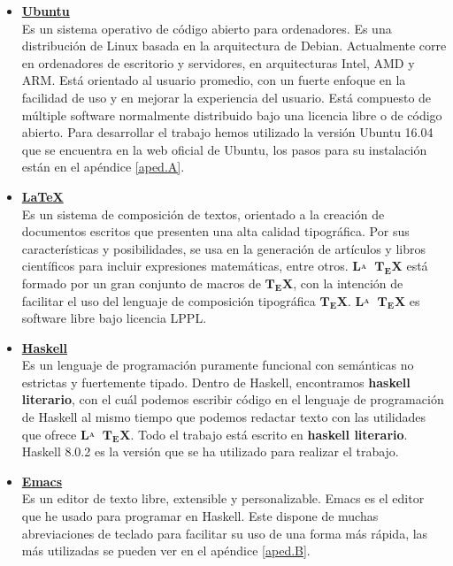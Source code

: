 \begin{itemize}

\item \href{https://www.ubuntu.com/}{\textbf{Ubuntu}}\\
Es un sistema operativo de código abierto para ordenadores. Es una distribución de Linux basada en la arquitectura de Debian. Actualmente corre en ordenadores de escritorio y servidores, en arquitecturas Intel, AMD y ARM. Está orientado al usuario promedio, con un fuerte enfoque en la facilidad de uso y en mejorar la experiencia del usuario. Está compuesto de múltiple software normalmente distribuido bajo una licencia libre o de código abierto. Para desarrollar el trabajo hemos utilizado la versión Ubuntu 16.04 que se encuentra en la web oficial de Ubuntu, los pasos para su instalación están en el apéndice \ref{aped.A}. 

\item \href{https://www.latex-project.org/}{\textbf{LaTeX}}  \\
Es un sistema de composición de textos, orientado a la creación de documentos escritos que presenten una alta calidad tipográfica. Por sus características y posibilidades, se usa en la generación de artículos y libros científicos para incluir expresiones matemáticas, entre otros.  $\mathbf{L\!\!^{{}_{\scriptstyle A}} \!\!\!\!\!\;\; T\!_{\displaystyle E} \! X}$ está formado por un gran conjunto de macros de  $\mathbf{T\!_{\displaystyle E} \! X}$, con la intención de facilitar el uso del lenguaje de composición tipográfica ${\displaystyle \mathbf {T\!_{\displaystyle E}\!X} }$. $\mathbf{L\!\!^{{}_{\scriptstyle A}} \!\!\!\!\!\;\; T\!_{\displaystyle E} \! X}$ es software libre bajo licencia LPPL. 

\item \href{https://www.haskell.org/}{\textbf{Haskell}}\\
Es un lenguaje de programación puramente funcional con semánticas no estrictas y fuertemente tipado. Dentro de Haskell, encontramos \textbf{haskell literario}, con el cuál podemos escribir código en el lenguaje de programación de Haskell al mismo tiempo que podemos redactar texto con las utilidades que ofrece $\mathbf{L\!\!^{{}_{\scriptstyle A}} \!\!\!\!\!\;\; T\!_{\displaystyle E} \! X}$. Todo el trabajo está escrito en  \textbf{haskell literario}. Haskell 8.0.2 es la versión que se ha utilizado para realizar el trabajo.

\item \href{https://www.gnu.org/software/emacs/}{\textbf{Emacs}}\\
Es un editor de texto libre, extensible y personalizable. Emacs es el editor que he usado para programar en Haskell. Este dispone de muchas abreviaciones de teclado para facilitar su uso de una forma más rápida, las más utilizadas se pueden ver en el apéndice \ref{aped.B}.


\end{itemize}
